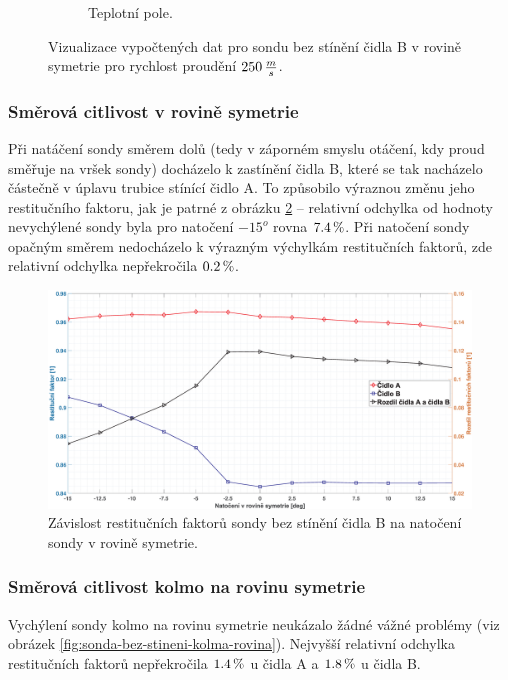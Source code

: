 \begin{figure}[ht!]
\begin{subfigure}{0.45\textwidth}
                    \caption{Teplotní pole.}
                \end{subfigure}
                \caption{Vizualizace vypočtených dat pro sondu bez stínění čidla B v rovině symetrie pro rychlost proudění $250 \, \frac{m}{s}$.}
                \label{fig:sonda-bez-stineni-vizualizace}
            \end{figure}


        \newpage
        \subsubsection{Směrová citlivost v rovině symetrie}
            Při natáčení sondy směrem dolů (tedy v záporném smyslu otáčení, kdy proud směřuje na vršek sondy) docházelo k zastínění čidla B, které se tak nacházelo částečně v úplavu trubice stínící čidlo A. To způsobilo výraznou změnu jeho restitučního faktoru, jak je patrné z obrázku \ref{fig:sonda-bez-stineni-rovina-symetrie} – relativní odchylka od hodnoty nevychýlené sondy byla pro natočení $-15^o$ rovna $7.4 \, \%$. Při natočení sondy opačným směrem nedocházelo k výrazným výchylkám restitučních faktorů, zde relativní odchylka nepřekročila $0.2 \, \%$.
            
            \begin{figure}[ht!]
                \centering
                \includegraphics*[width=\textwidth]{400_SIMULACE_KONSTRUKCNICH_UPRAV/Grafy/01_rovina_symetrie}
                \caption{Závislost restitučních faktorů sondy bez stínění čidla B na natočení sondy v rovině symetrie.}
                \label{fig:sonda-bez-stineni-rovina-symetrie}
            \end{figure}
        \subsubsection{Směrová citlivost kolmo na rovinu symetrie}
            Vychýlení sondy kolmo na rovinu symetrie neukázalo žádné vážné problémy (viz obrázek \ref{fig:sonda-bez-stineni-kolma-rovina}). Nejvyšší relativní odchylka restitučních faktorů nepřekročila $1.4 \, \%$ u čidla A a $1.8 \, \%$ u čidla B.
            
